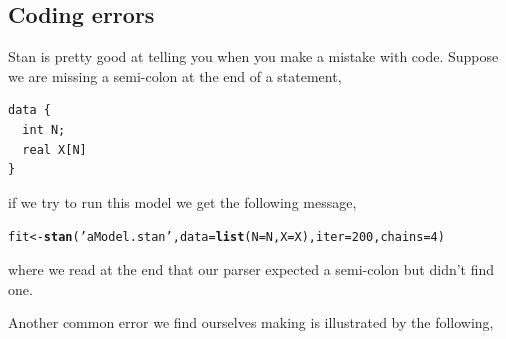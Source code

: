 \documentclass[11pt,fullpage]{book}
\makeatletter
\newenvironment{kframe}{%
	\def\at@end@of@kframe{}%
	\ifinner\ifhmode%
	\def\at@end@of@kframe{\end{minipage}}%
\begin{minipage}{\columnwidth}%
	\fi\fi%
	\def\FrameCommand##1{\hskip\@totalleftmargin \hskip-\fboxsep
		\colorbox{shadecolor}{##1}\hskip-\fboxsep
		\hskip-\linewidth \hskip-\@totalleftmargin \hskip\columnwidth}%
	\MakeFramed {\advance\hsize-\width
		\@totalleftmargin\z@ \linewidth\hsize
		\@setminipage}}%
{\par\unskip\endMakeFramed%
	\at@end@of@kframe}
\newcommand{\hlnum}[1]{\textcolor[rgb]{0.686,0.059,0.569}{#1}}%
\newcommand{\hlstr}[1]{\textcolor[rgb]{0.192,0.494,0.8}{#1}}%
\newcommand{\hlstd}[1]{\textcolor[rgb]{0.345,0.345,0.345}{#1}}%
\newcommand{\hlkwb}[1]{\textcolor[rgb]{0.69,0.353,0.396}{#1}}%
\newcommand{\hlkwc}[1]{\textcolor[rgb]{0.333,0.667,0.333}{#1}}%
\newcommand{\hlkwd}[1]{\textcolor[rgb]{0.737,0.353,0.396}{\textbf{#1}}}%
\newenvironment{knitrout}{}{} %
\makeatother
\begin{document}
\subsection{Coding errors}
Stan is pretty good at telling you when you make a mistake with code. Suppose we are missing a semi-colon at the end of a statement,

\begin{verbatim}
data { 
  int N;
  real X[N]
} 
\end{verbatim}
if we try to run this model we get the following message,

\begin{knitrout}\small
		\color{fgcolor}\begin{kframe}
\begin{alltt}
\hlstd{fit} \hlkwb{<-} \hlkwd{stan}\hlstd{(}\hlstr{'aModel.stan'}\hlstd{,}\hlkwc{data}\hlstd{=}\hlkwd{list}\hlstd{(}\hlkwc{N}\hlstd{=N,}\hlkwc{X}\hlstd{=X),}\hlkwc{iter}\hlstd{=}\hlnum{200}\hlstd{,}\hlkwc{chains}\hlstd{=}\hlnum{4}\hlstd{)}
\end{alltt}
{\ttfamily\noindent\itshape\color{messagecolor}{\#\# SYNTAX ERROR, MESSAGE(S) FROM PARSER:}}

{\ttfamily\noindent\itshape\color{messagecolor}{\#\# }}

{\ttfamily\noindent\itshape\color{messagecolor}{\#\# ERROR at line 4}}

{\ttfamily\noindent\itshape\color{messagecolor}{\#\# }}

{\ttfamily\noindent\itshape\color{messagecolor}{\#\#\ \  2:\ \ \ \ \ \ int N;}}

{\ttfamily\noindent\itshape\color{messagecolor}{\#\#\ \  3:\ \ \ \ \ \ real X[N]}}

{\ttfamily\noindent\itshape\color{messagecolor}{\#\#\ \  4:\ \ \ \ \}}}

{\ttfamily\noindent\itshape\color{messagecolor}{\#\#\ \ \ \ \ \ \ \  \textasciicircum{}}}

{\ttfamily\noindent\itshape\color{messagecolor}{\#\#\ \  5:}}

{\ttfamily\noindent\itshape\color{messagecolor}{\#\# }}

{\ttfamily\noindent\itshape{}}
		\end{kframe}
	\end{knitrout}
where we read at the end that our parser expected a semi-colon but didn't find one. 

Another common error we find ourselves making is illustrated by the following,
\end{document}
